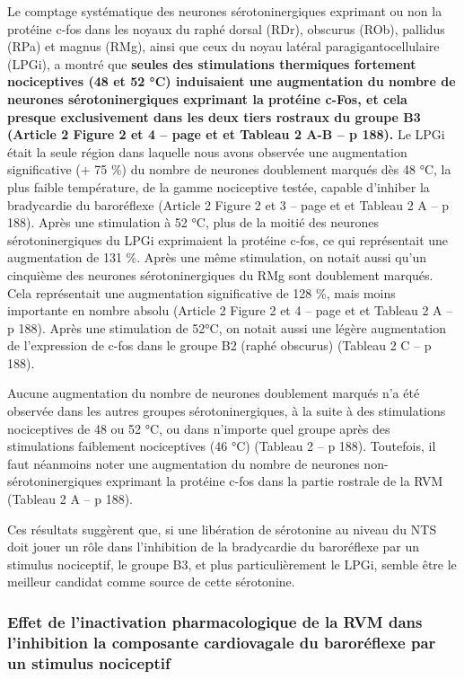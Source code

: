 \documentclass[a4paper,12pt,twoside]{report}
\begin{document}
Le comptage systématique des neurones sérotoninergiques exprimant ou non la protéine c-fos dans les noyaux du raphé dorsal (RDr), obscurus (ROb), pallidus (RPa) et magnus (RMg), ainsi que ceux du noyau latéral paragigantocellulaire (LPGi), a montré que \textbf{seules des stimulations thermiques fortement nociceptives (48 et 52 °C) induisaient une augmentation du nombre de neurones sérotoninergiques exprimant la protéine c-Fos, et cela presque exclusivement dans les deux tiers rostraux du groupe B3 (Article 2 Figure 2 et 4 – page \pageref{Article2-FIG2} et \pageref{Article2-FIG4} et Tableau 2 A-B – p 188).} Le LPGi était la seule région dans laquelle nous avons observée une augmentation significative (+ 75 \%) du nombre de neurones doublement marqués dès 48 °C, la plus faible température, de la gamme nociceptive testée, capable d’inhiber la bradycardie du baroréflexe (Article 2 Figure 2 et 3 – page \pageref{Article2-FIG2} et \pageref{Article2-FIG3} et Tableau 2 A – p 188). Après une stimulation à 52 °C, plus de la moitié des neurones sérotoninergiques du LPGi exprimaient la protéine c-fos, ce qui représentait une augmentation de 131 \%. Après une même stimulation, on notait aussi qu’un cinquième des neurones sérotoninergiques du RMg sont doublement marqués. Cela représentait une augmentation significative de 128 \%, mais moins importante en nombre absolu (Article 2 Figure 2 et 4 – page \pageref{Article2-FIG2} et \pageref{Article2-FIG4} et Tableau 2 A – p 188). Après une stimulation de 52°C, on notait aussi une légère augmentation de l'expression de c-fos dans le groupe B2 (raphé obscurus) (Tableau 2 C – p 188). 

Aucune augmentation du nombre de neurones doublement marqués n’a été observée dans les autres groupes sérotoninergiques, à la suite à des stimulations nociceptives de 48 ou 52 °C, ou dans n’importe quel groupe après des stimulations faiblement nociceptives (46 °C) (Tableau 2 – p 188). Toutefois, il faut néanmoins noter une augmentation du nombre de neurones non-sérotoninergiques exprimant la protéine c-fos dans la partie rostrale de la RVM (Tableau 2 A – p 188).

Ces résultats suggèrent que, si une libération de sérotonine au niveau du NTS doit jouer un rôle dans l’inhibition de la bradycardie du baroréflexe par un stimulus nociceptif, le groupe B3, et plus particulièrement le LPGi, semble être le meilleur candidat comme source de cette sérotonine.

\subsubsection{Effet de l’inactivation pharmacologique de la RVM dans l’inhibition la composante cardiovagale du baroréflexe par un stimulus nociceptif}
\end{document}
